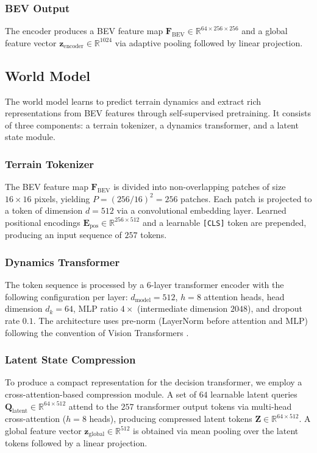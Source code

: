 \documentclass[journal]{IEEEtran}
\begin{document}
\subsubsection{BEV Output}
The encoder produces a BEV feature map $\mathbf{F}_\text{BEV} \in \mathbb{R}^{64 \times 256 \times 256}$ and a global feature vector $\mathbf{z}_\text{encoder} \in \mathbb{R}^{1024}$ via adaptive pooling followed by linear projection.

\subsection{World Model}
\label{sec:world_model}

The world model learns to predict terrain dynamics and extract rich representations from BEV features through self-supervised pretraining. It consists of three components: a terrain tokenizer, a dynamics transformer, and a latent state module.

\subsubsection{Terrain Tokenizer}
The BEV feature map $\mathbf{F}_\text{BEV}$ is divided into non-overlapping patches of size $16 \times 16$ pixels, yielding $P = (256/16)^2 = 256$ patches. Each patch is projected to a token of dimension $d = 512$ via a convolutional embedding layer. Learned positional encodings $\mathbf{E}_\text{pos} \in \mathbb{R}^{256 \times 512}$ and a learnable \texttt{[CLS]} token are prepended, producing an input sequence of $257$ tokens.

\subsubsection{Dynamics Transformer}
The token sequence is processed by a 6-layer transformer encoder with the following configuration per layer: $d_\text{model} = 512$, $h = 8$ attention heads, head dimension $d_k = 64$, MLP ratio $4\times$ (intermediate dimension $2048$), and dropout rate $0.1$. The architecture uses pre-norm (LayerNorm before attention and MLP) following the convention of Vision Transformers \cite{dosovitskiy2021}.

\subsubsection{Latent State Compression}
To produce a compact representation for the decision transformer, we employ a cross-attention-based compression module. A set of $64$ learnable latent queries $\mathbf{Q}_\text{latent} \in \mathbb{R}^{64 \times 512}$ attend to the $257$ transformer output tokens via multi-head cross-attention ($h = 8$ heads), producing compressed latent tokens $\mathbf{Z} \in \mathbb{R}^{64 \times 512}$. A global feature vector $\mathbf{z}_\text{global} \in \mathbb{R}^{512}$ is obtained via mean pooling over the latent tokens followed by a linear projection.
\end{document}
